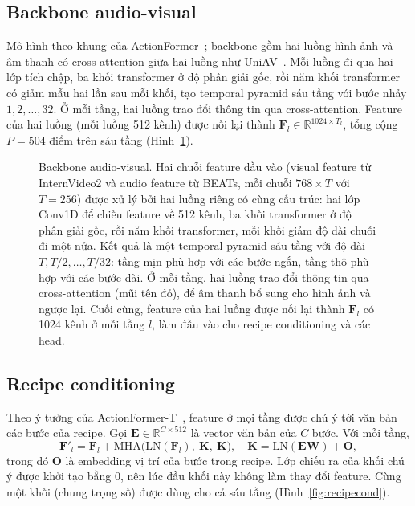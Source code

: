 \documentclass{IEEEtran}
\begin{document}
\subsection{Backbone audio-visual}
Mô hình theo khung của ActionFormer~\cite{actionformer}; backbone gồm hai luồng hình ảnh và âm thanh có cross-attention giữa hai luồng như UniAV~\cite{uniav}. Mỗi luồng đi qua hai lớp tích chập, ba khối transformer ở độ phân giải gốc, rồi năm khối transformer có giảm mẫu hai lần sau mỗi khối, tạo temporal pyramid sáu tầng với bước nhảy $1, 2, \ldots, 32$. Ở mỗi tầng, hai luồng trao đổi thông tin qua cross-attention. Feature của hai luồng (mỗi luồng 512 kênh) được nối lại thành $\mathbf{F}_l \in \mathbb{R}^{1024 \times T_l}$, tổng cộng $P = 504$ điểm trên sáu tầng (Hình~\ref{fig:backbone}).

\begin{figure}[t]
\centering
\resizebox{\columnwidth}{!}{}
\caption{Backbone audio-visual. Hai chuỗi feature đầu vào (visual feature từ InternVideo2 và audio feature từ BEATs, mỗi chuỗi $768 \times T$ với $T = 256$) được xử lý bởi hai luồng riêng có cùng cấu trúc: hai lớp Conv1D để chiếu feature về 512 kênh, ba khối transformer ở độ phân giải gốc, rồi năm khối transformer, mỗi khối giảm độ dài chuỗi đi một nửa. Kết quả là một temporal pyramid sáu tầng với độ dài $T, T/2, \ldots, T/32$: tầng mịn phù hợp với các bước ngắn, tầng thô phù hợp với các bước dài. Ở mỗi tầng, hai luồng trao đổi thông tin qua cross-attention (mũi tên đỏ), để âm thanh bổ sung cho hình ảnh và ngược lại. Cuối cùng, feature của hai luồng được nối lại thành $\mathbf{F}_l$ có 1024 kênh ở mỗi tầng $l$, làm đầu vào cho recipe conditioning và các head.}
\label{fig:backbone}
\end{figure}

\subsection{Recipe conditioning}
Theo ý tưởng của ActionFormer-T~\cite{htstep}, feature ở mọi tầng được chú ý tới văn bản các bước của recipe. Gọi $\mathbf{E} \in \mathbb{R}^{C \times 512}$ là vector văn bản của $C$ bước. Với mỗi tầng,
\begin{equation}
\label{eq:artc}
\mathbf{F}'_l = \mathbf{F}_l + \mathrm{MHA}\big(\mathrm{LN}(\mathbf{F}_l),\ \mathbf{K},\ \mathbf{K}\big), \quad \mathbf{K} = \mathrm{LN}(\mathbf{E}\mathbf{W}) + \mathbf{O},
\end{equation}
trong đó $\mathbf{O}$ là embedding vị trí của bước trong recipe. Lớp chiếu ra của khối chú ý được khởi tạo bằng 0, nên lúc đầu khối này không làm thay đổi feature. Cùng một khối (chung trọng số) được dùng cho cả sáu tầng (Hình~\ref{fig:recipecond}).
\end{document}

